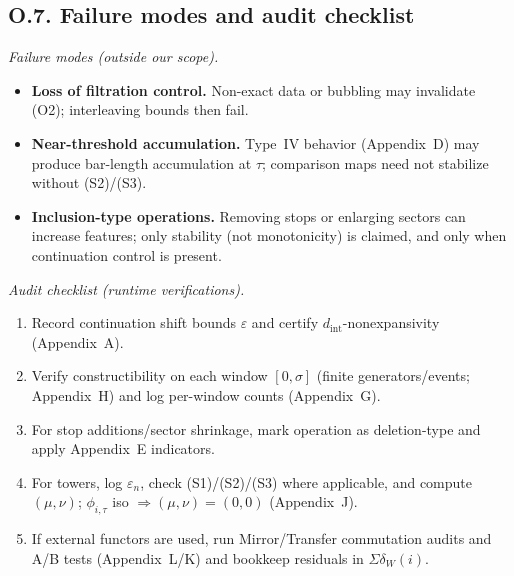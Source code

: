 \documentclass[11pt]{article}
\numberwithin{equation}{section}
\theoremstyle{plain}
\theoremstyle{definition}
\theoremstyle{remark}
\theoremstyle{plain}
\theoremstyle{definition}
\numberwithin{equation}{section}
\theoremstyle{definition}
\numberwithin{equation}{section}
\theoremstyle{plain}
\theoremstyle{definition}
\theoremstyle{remark}
\begin{document}
\subsection*{O.7. Failure modes and audit checklist}
\noindent\emph{Failure modes (outside our scope).}
\begin{itemize}\itemsep0.25em
  \item \textbf{Loss of filtration control.} Non-exact data or bubbling may invalidate (O2); interleaving bounds then fail.
  \item \textbf{Near-threshold accumulation.} Type~IV behavior (Appendix~D) may produce bar-length accumulation at \(\tau\); comparison maps need not stabilize without (S2)/(S3).
  \item \textbf{Inclusion-type operations.} Removing stops or enlarging sectors can increase features; only stability (not monotonicity) is claimed, and only when continuation control is present.
\end{itemize}

\noindent\emph{Audit checklist (runtime verifications).}
\begin{enumerate}\itemsep0.25em
  \item Record continuation shift bounds \(\varepsilon\) and certify \(d_{\mathrm{int}}\)-nonexpansivity (Appendix~A).
  \item Verify constructibility on each window \([0,\sigma]\) (finite generators/events; Appendix~H) and log per-window counts (Appendix~G).
  \item For stop additions/sector shrinkage, mark operation as deletion-type and apply Appendix~E indicators.
  \item For towers, log \(\varepsilon_n\), check (S1)/(S2)/(S3) where applicable, and compute \((\mu,\nu)\); \(\phi_{i,\tau}\) iso \(\Rightarrow (\mu,\nu)=(0,0)\) (Appendix~J).
  \item If external functors are used, run Mirror/Transfer commutation audits and A/B tests (Appendix~L/K) and bookkeep residuals in \(\Sigma\delta_W(i)\).
\end{enumerate}

\end{document}
